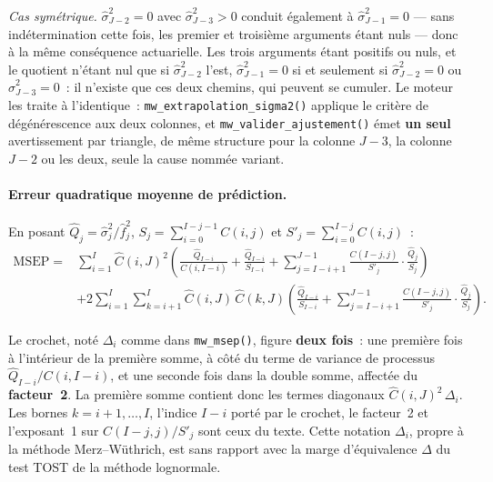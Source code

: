 \documentclass[a4paper,11pt]{article}
\newcommand{\code}[1]{\texttt{\small #1}}
\begin{document}
\emph{Cas symétrique.} $\hat\sigma_{J-2}^2 = 0$ avec $\hat\sigma_{J-3}^2 > 0$
conduit également à $\hat\sigma_{J-1}^2 = 0$ --- sans indétermination cette
fois, les premier et troisième arguments étant nuls --- donc à la même
conséquence actuarielle. Les trois arguments étant positifs ou nuls, et le
quotient n'étant nul que si $\hat\sigma_{J-2}^2$ l'est, $\hat\sigma_{J-1}^2 = 0$
si et seulement si $\hat\sigma_{J-2}^2 = 0$ ou $\hat\sigma_{J-3}^2 = 0$~: il
n'existe que ces deux chemins, qui peuvent se cumuler. Le moteur les traite
à l'identique~: \code{mw\_extrapolation\_sigma2()} applique le critère de
dégénérescence aux deux colonnes, et \code{mw\_valider\_ajustement()} émet
\textbf{un seul} avertissement par triangle, de même structure pour la
colonne $J-3$, la colonne $J-2$ ou les deux, seule la cause nommée variant.

\paragraph{Erreur quadratique moyenne de prédiction.} En posant
$\hat Q_j = \hat\sigma_j^2/\hat f_j^2$,
$S_j = \sum_{i=0}^{I-j-1} C(i,j)$ et $S'_j = \sum_{i=0}^{I-j} C(i,j)$~:
\[
\begin{aligned}
  \mathrm{MSEP} = {} & \sum_{i=1}^{I}\hat C(i,J)^2
  \left(\frac{\hat Q_{I-i}}{C(i,I-i)} + \frac{\hat Q_{I-i}}{S_{I-i}}
  + \sum_{j=I-i+1}^{J-1}\frac{C(I-j,j)}{S'_j}\cdot\frac{\hat Q_j}{S_j}\right) \\[2pt]
  & + 2\sum_{i=1}^{I}\sum_{k=i+1}^{I}\hat C(i,J)\,\hat C(k,J)
  \left(\frac{\hat Q_{I-i}}{S_{I-i}}
  + \sum_{j=I-i+1}^{J-1}\frac{C(I-j,j)}{S'_j}\cdot\frac{\hat Q_j}{S_j}\right).
\end{aligned}
\]

\noindent
Le crochet, noté $\Delta_i$ comme dans \code{mw\_msep()}, figure
\textbf{deux fois}~: une première fois à l'intérieur de la première somme, à
côté du terme de variance de processus $\hat Q_{I-i}/C(i,I-i)$, et une seconde
fois dans la double somme, affectée du \textbf{facteur~2}. La première somme
contient donc les termes diagonaux $\hat C(i,J)^2\,\Delta_i$. Les bornes
$k = i+1,\dots,I$, l'indice $I-i$ porté par le crochet, le facteur~2 et
l'exposant~1 sur $C(I-j,j)/S'_j$ sont ceux du texte. Cette notation
$\Delta_i$, propre à la méthode Merz--Wüthrich, est sans rapport avec la marge
d'équivalence $\Delta$ du test TOST de la méthode lognormale.
\end{document}
